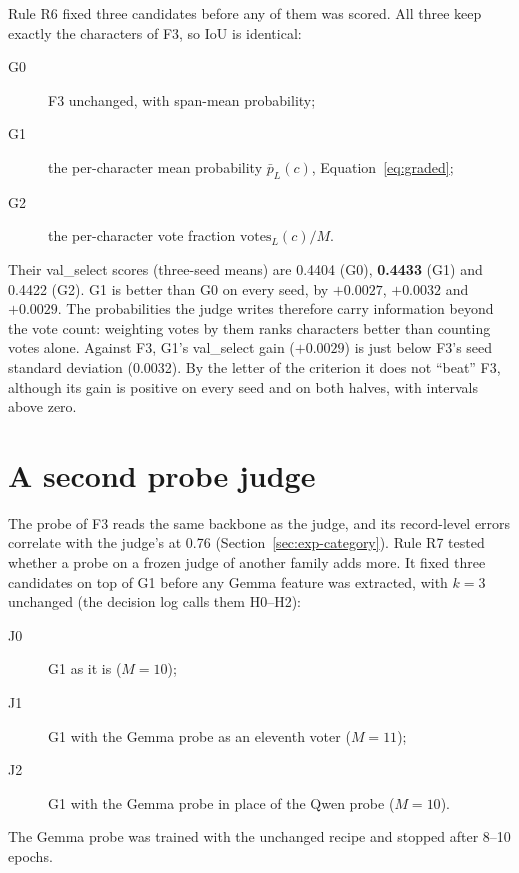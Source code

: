 Rule R6 fixed three candidates before any of them was scored. All three keep exactly the characters of F3, so IoU is identical:
\begin{description}
    \item[G0] F3 unchanged, with span-mean probability;
    \item[G1] the per-character mean probability $\bar p_L(c)$, Equation~\eqref{eq:graded};
    \item[G2] the per-character vote fraction $\mathrm{votes}_L(c)/M$.
\end{description}
Their val\_select scores (three-seed means) are 0.4404 (G0), \textbf{0.4433} (G1) and 0.4422 (G2). G1 is better than G0 on every seed, by $+0.0027$, $+0.0032$ and $+0.0029$. The probabilities the judge writes therefore carry information beyond the vote count: weighting votes by them ranks characters better than counting votes alone. Against F3, G1's val\_select gain ($+0.0029$) is just below F3's seed standard deviation (0.0032). By the letter of the criterion it does not ``beat'' F3, although its gain is positive on every seed and on both halves, with intervals above zero.

\section{A second probe judge}\label{sec:exp-judge2}

The probe of F3 reads the same backbone as the judge, and its record-level errors correlate with the judge's at 0.76 (Section~\ref{sec:exp-category}). Rule R7 tested whether a probe on a frozen judge of another family adds more. It fixed three candidates on top of G1 before any Gemma feature was extracted, with $k = 3$ unchanged (the decision log calls them H0--H2):
\begin{description}
    \item[J0] G1 as it is ($M = 10$);
    \item[J1] G1 with the Gemma probe as an eleventh voter ($M = 11$);
    \item[J2] G1 with the Gemma probe in place of the Qwen probe ($M = 10$).
\end{description}
The Gemma probe was trained with the unchanged recipe and stopped after 8--10 epochs.


